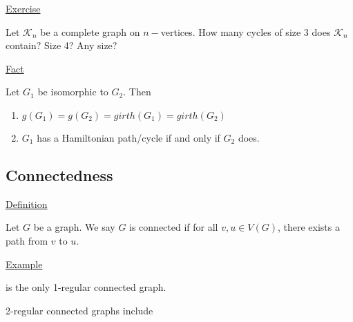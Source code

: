 \documentclass{article}
\begin{document}
\underline{Exercise}

Let $\mathcal{K}_n$ be a complete graph on $n-$vertices. How many cycles of size 3 does $\mathcal{K}_n$ contain? Size 4? Any size?

\underline{Fact}

Let $G_1$ be isomorphic to $G_2$. Then
\begin{enumerate}
    \item $g(G_1) = g(G_2) = girth(G_1) = girth(G_2)$
    \item $G_1$ has a Hamiltonian path/cycle if and only if $G_2$ does. 
\end{enumerate}

\subsection{Connectedness}

\underline{Definition}

Let $G$ be a graph. We say $G$ is connected if for all $v,u \in V(G)$, there exists a path from $v$ to $u$. 

\underline{Example}

\begin{center}
\end{center}

is the only 1-regular connected graph. 

2-regular connected graphs include
\end{document}

